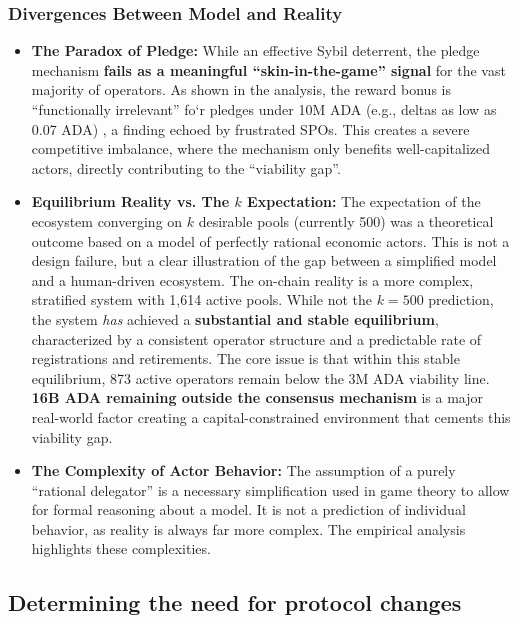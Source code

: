 \documentclass[11pt, letterpaper]{article}
\begin{document}
\subsubsection{Divergences Between Model and Reality}

\begin{itemize}
	\item \textbf{The Paradox of Pledge:} While an effective Sybil deterrent, the pledge mechanism
	      \textbf{fails as a meaningful ``skin-in-the-game'' signal} for the vast majority of operators. As shown
	      in the analysis, the reward bonus is ``functionally irrelevant'' fo`r pledges under 10M ADA (e.g., deltas
	      as low as 0.07 ADA) , a finding echoed by frustrated SPOs. This creates a severe competitive imbalance,
	      where the mechanism only benefits well-capitalized actors, directly contributing to the ``viability gap''.
	\item \textbf{Equilibrium Reality vs. The $k$ Expectation:} The expectation of the ecosystem converging
	      on $k$ desirable pools (currently 500) was a theoretical outcome based on a model of perfectly rational
	      economic actors. This is not a design failure, but a clear illustration of the gap between a simplified
	      model and a human-driven ecosystem. The on-chain reality is a more complex, stratified system with 1,614
	      active pools. While not the $k=500$ prediction, the system \textit{has} achieved a
	      \textbf{substantial and stable equilibrium}, characterized by a consistent operator structure and
	      a predictable rate of registrations and retirements. The core issue is that within this stable equilibrium,
	      873 active operators remain below the 3M ADA viability line.
	      \textbf{16B ADA remaining outside the consensus mechanism} is a major real-world factor creating a
	      capital-constrained environment that cements this viability gap.
	\item \textbf{The Complexity of Actor Behavior:} The assumption of a purely ``rational delegator'' is a
	      necessary simplification used in game theory to allow for formal reasoning about a model. It is not a
	      prediction of individual behavior, as reality is always far more complex. The empirical analysis highlights
	      these complexities.
\end{itemize}

\subsection{Determining the need for protocol changes}
\label{sec:need-for-changes}
\end{document}
